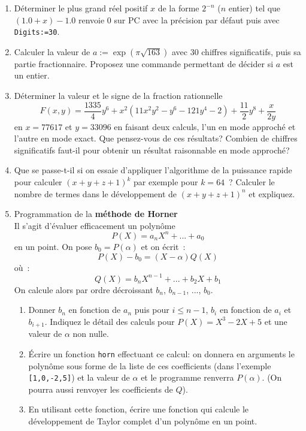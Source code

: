 \documentclass[a4paper,11pt]{book}
\begin{document}
\begin{giacjshere}
\begin{enumerate}
\item D\'eterminer le plus grand r\'eel positif $x$ de la forme 
$2^{-n}$ ($n$ entier)
tel que $(1.0+x)-1.0$ renvoie 0 sur PC avec la pr\'ecision par
d\'efaut puis avec \verb|Digits:=30|.
\item Calculer la valeur de $a:=\exp(\pi \sqrt{163})$ avec 30 chiffres
significatifs, puis sa partie fractionnaire. Proposez une commande
permettant de d\'ecider si $a$ est un entier.
\item 
D\'eterminer la valeur et le signe de la fraction rationnelle 
\[ F(x,y)= \frac{1335}{4} y^6 + x^2 (11x^2 y^2-y^6 -121y^4-2) + 
\frac{11}{2} y^8 + \frac{x}{2y}\]
en $x=77617$ et $y=33096$ en faisant deux calculs, l'un en mode approch\'e et 
l'autre en mode exact. Que pensez-vous de ces r\'esultats?
Combien de chiffres significatifs faut-il pour obtenir un r\'esultat
raisonnable en mode approch\'e?
\item Que se passe-t-il si on essaie d'appliquer l'algorithme de la
puissance rapide pour calculer $(x+y+z+1)^{k}$ par exemple pour
$k=64$~? 
Calculer le nombre
de termes dans le d\'eveloppement de $(x+y+z+1)^n$ et expliquez.
\item Programmation de la {\bf m\'ethode de Horner}\\
Il s'agit d'\'evaluer efficacement un polyn\^ome 
\[ P(X) = a_n X^n + ... + a_0 \]
en un point.
On pose $b_0=P(\alpha )$ et on \'ecrit~:
\[ P(X)-b_0=(X-\alpha )Q(X) \]
o\`u~:
\[ Q(X) = b_n X^{n-1} + ... +b_2 X + b_1 \]
On calcule alors par ordre d\'ecroissant $b_n$, $b_{n-1}$, ..., $b_0$.
\begin{enumerate}
\item
Donner $b_n$ en fonction de $a_n$ puis pour $i\leq n-1$, $b_i$
en fonction de $a_i$ et $b_{i+1}$. Indiquez le d\'etail des calculs
pour $P(X)=X^3-2X+5$ et une valeur de $\alpha $ non nulle.
\item \'Ecrire un fonction \verb|horn| effectuant ce calcul:
on donnera en arguments le polyn\^ome sous forme de la
liste de ces coefficients (dans l'exemple \verb|[1,0,-2,5]|) et la
valeur de $\alpha $ et le programme renverra $P(\alpha )$.
(On pourra aussi renvoyer les coefficients de $Q$).
\item
En utilisant cette fonction, \'ecrire une fonction qui calcule
le d\'eveloppement de Taylor complet d'un polyn\^ome en un point.
\end{enumerate}
\end{enumerate}


\end{giacjshere}
\end{document}
